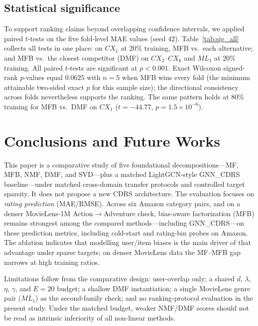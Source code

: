 \documentclass[pdflatex,sn-mathphys-num]{sn-jnl}%
\theoremstyle{thmstyleone}%
\theoremstyle{thmstyletwo}%
\theoremstyle{thmstylethree}%
\begin{document}
\subsection{Statistical significance}
To support ranking claims beyond overlapping confidence intervals, we applied paired $t$-tests on the five fold-level MAE values (seed $42$). Table~\ref{tab:sig_all} collects all tests in one place: on $CX_1$ at 20\% training, MFB vs.\ each alternative; and MFB vs.\ the closest competitor (DMF) on $CX_2$--$CX_6$ and $ML_1$ at 20\% training. All paired $t$-tests are significant at $p<0.001$. Exact Wilcoxon signed-rank $p$-values equal $0.0625$ with $n=5$ when MFB wins every fold (the minimum attainable two-sided exact $p$ for this sample size); the directional consistency across folds nevertheless supports the ranking. The same pattern holds at 80\% training for MFB vs.\ DMF on $CX_1$ ($t=-44.77$, $p=1.5\times 10^{-6}$).

\section{Conclusions and Future Works}

This paper is a comparative study of five foundational decompositions---MF, MFB, NMF, DMF, and SVD---plus a matched LightGCN-style GNN\_CDRS baseline---under matched cross-domain transfer protocols and controlled target sparsity. It does not propose a new CDRS architecture. The evaluation focuses on \emph{rating prediction} (MAE/RMSE). Across six Amazon category pairs, and on a denser MovieLens-1M Action$\to$Adventure check, bias-aware factorization (MFB) remains strongest among the compared methods---including GNN\_CDRS---on these prediction metrics, including cold-start and rating-bin probes on Amazon. The ablation indicates that modelling user/item biases is the main driver of that advantage under sparse targets; on denser MovieLens data the MF--MFB gap narrows at high training ratios.

Limitations follow from the comparative design: user-overlap only; a shared $d$, $\lambda$, $\eta$, $\gamma$, and $E=20$ budget; a shallow DMF instantiation; a single MovieLens genre pair ($ML_1$) as the second-family check; and no ranking-protocol evaluation in the present study. Under the matched budget, weaker NMF/DMF scores should not be read as intrinsic inferiority of all non-linear methods.
\end{document}
